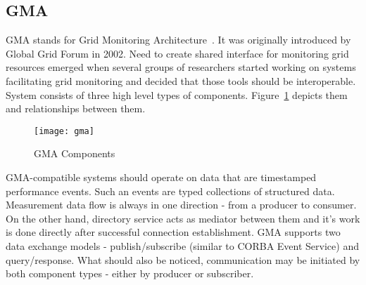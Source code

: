 \subsection{GMA}
\label{ssec:gma}
GMA stands for Grid Monitoring Architecture~\cite{GMA1,GMA2}. It was originally introduced by Global Grid Forum in 2002. Need to create shared
interface for monitoring grid resources emerged when several groups of researchers started working on systems facilitating grid monitoring and
decided that those tools should be interoperable. System consists of three high level types of components. Figure~\ref{fig:gma} depicts them and relationships between them.

\begin{figure}[ht]
  \centering
  \texttt{[image: gma]}
  \caption{GMA Components}
  \label{fig:gma}
\end{figure}

GMA-compatible systems should operate on data that are timestamped performance events. Such an events are typed collections of structured
data. Measurement data flow is always in one direction - from a producer to consumer. On the other hand, directory service acts as mediator
between them and it\rq{}s work is done directly after successful connection establishment. GMA supports two data exchange models -
publish/subscribe (similar to CORBA Event Service) and query/response. What should also be noticed, communication may be initiated by both
component types - either by producer or subscriber.

